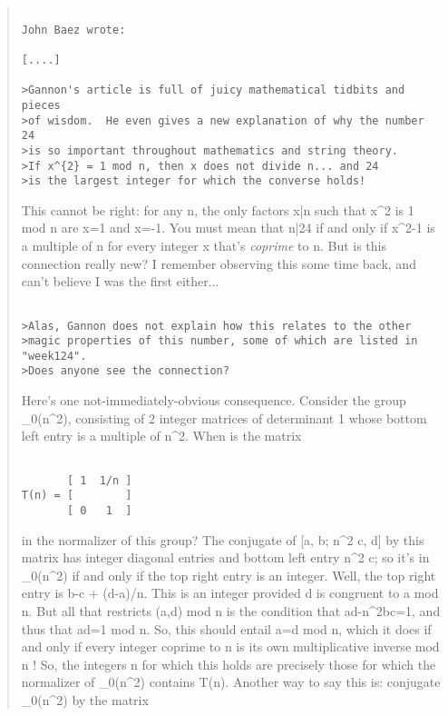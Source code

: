 \begin{quote}

\begin{verbatim}

John Baez wrote:

[....]

>Gannon's article is full of juicy mathematical tidbits and pieces
>of wisdom.  He even gives a new explanation of why the number 24
>is so important throughout mathematics and string theory.
>If x^{2} = 1 mod n, then x does not divide n... and 24
>is the largest integer for which the converse holds!
\end{verbatim}
    
This cannot be right: for any n, the only factors x|n
such that x^{2} is 1 mod n are x=1 and x=-1.  You must mean
that n|24 if and only if x^{2}-1 is a multiple of n for every integer
x that's \emph{coprime} to n.  But is this connection really new?
I remember observing this some time back, and can't believe
I was the first either...

\begin{verbatim}

>Alas, Gannon does not explain how this relates to the other
>magic properties of this number, some of which are listed in "week124".
>Does anyone see the connection?
\end{verbatim}
    
Here's one not-immediately-obvious consequence.  Consider the group
\Gamma _{0}(n^{2}), consisting of 2 integer 
matrices of determinant 1
whose bottom left entry is a multiple of n^{2}.  When is the matrix

\begin{verbatim}

       [ 1  1/n ]
T(n) = [        ]
       [ 0   1  ]
\end{verbatim}
    
in the normalizer of this group?  The conjugate of [a, b; n^{2} c, d]
by this matrix has integer diagonal entries and bottom left entry 
n^{2} c;
so it's in \Gamma _{0}(n^{2}) if and only if the 
top right entry is an integer.
Well, the top right entry is  b-c + (d-a)/n.  This is an integer
provided d is congruent to a mod n.  But all that restricts (a,d)
mod n is the condition that ad-n^{2}bc=1, and thus that ad=1 mod n.
So, this should entail a=d mod n, which it does if and only if every
integer coprime to n is its own multiplicative inverse mod n !
So, the integers n for which this holds are precisely those for which
the normalizer of \Gamma _{0}(n^{2}) contains T(n).  
Another way to say this is: conjugate \Gamma _{0}(n^{2}) 
by the matrix


\end{quote}
